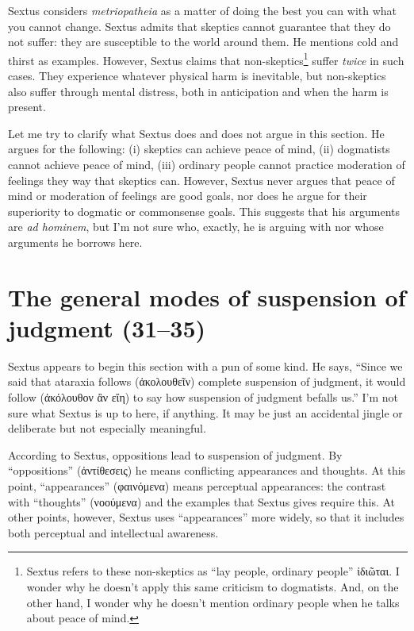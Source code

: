 Sextus considers \textit{metriopatheia} as a matter of doing the best you can with what you cannot change. Sextus admits that skeptics cannot guarantee that they do not suffer: they are susceptible to the world around them. He mentions cold and thirst as examples. However, Sextus claims that non-skeptics\footnote{Sextus refers to these non-skeptics as ``lay people, ordinary people'' \textgreek{ἰδιῶται}. I wonder why he doesn't apply this same criticism to dogmatists. And, on the other hand, I wonder why he doesn't mention ordinary people when he talks about peace of mind.} suffer \textit{twice} in such cases. They experience whatever physical harm is inevitable, but non-skeptics also suffer through mental distress, both in anticipation and when the harm is present.

Let me try to clarify what Sextus does and does not argue in this section. He argues for the following: (i) skeptics can achieve peace of mind, (ii) dogmatists cannot achieve peace of mind, (iii) ordinary people cannot practice moderation of feelings they way that skeptics can. However, Sextus never argues that peace of mind or moderation of feelings are good goals, nor does he argue for their superiority to dogmatic or commonsense goals. This suggests that his arguments are \textit{ad hominem}, but I'm not sure who, exactly, he is arguing with nor whose arguments he borrows here.

\section{The general modes of suspension of judgment (31--35)}

Sextus appears to begin this section with a pun of some kind. He says, ``Since we said that ataraxia follows (\textgreek{ἀκολουθεῖν}) complete suspension of judgment, it would follow (\textgreek{ἀκόλουθον ἂν εἴη}) to say how suspension of judgment befalls us.'' I'm not sure what Sextus is up to here, if anything. It may be just an accidental jingle or deliberate but not especially meaningful.

According to Sextus, oppositions lead to suspension of judgment. By ``oppositions'' (\textgreek{ἀντίθεσεις}) he means conflicting appearances and thoughts. At this point, ``appearances'' (\textgreek{φαινόμενα}) means perceptual appearances: the contrast with ``thoughts'' (\textgreek{νοούμενα}) and the examples that Sextus gives require this. At other points, however, Sextus uses ``appearances'' more widely, so that it includes both perceptual and intellectual awareness. 

